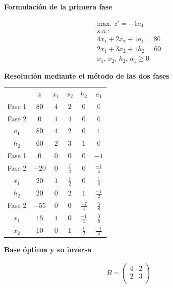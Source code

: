 \textbf{Formulación de la primera fase}

\begin{equation}
\begin{split}
\mbox{max. } z' = -1a_1\\
s.a.:\\
4x_1+2x_2+1a_1 = 80\\
2x_1+3x_2+1h_2 = 60\\
x_1,\,x_2,\,h_2,\,a_1\geq 0\end{split}
\end{equation}

\textbf{Resolución mediante el método de las dos fases}

\begin{center}
\begin{tabular}{c|c|cccc|}
 & $z$ & $x_1$ & $x_2$ & $h_2$ & $a_1$\\ 
Fase 1 & $80$ & $4$ & $2$ & $0$ & $0$ \\ 
Fase 2 & $0$ & $1$ & $4$ & $0$ & $0$ \\ 
\hline
$a_1$ & $80$  & $4$ & $2$ & $0$ & $1$\\ 
$h_2$ & $60$  & $2$ & $3$ & $1$ & $0$\\ 
\hline
Fase 1 & $0$ & $0$ & $0$ & $0$ & $-1$ \\ 
Fase 2 & $-20$ & $0$ & $\frac{7}{2}$ & $0$ & $\frac{-1}{4}$ \\ 
\hline
$x_1$ & $20$  & $1$ & $\frac{1}{2}$ & $0$ & $\frac{1}{4}$\\ 
$h_2$ & $20$  & $0$ & $2$ & $1$ & $\frac{-1}{2}$\\ 
\hline
Fase 2 & $-55$ & $0$ & $0$ & $\frac{-7}{4}$ & $\frac{5}{8}$ \\ 
\hline
$x_1$ & $15$  & $1$ & $0$ & $\frac{-1}{4}$ & $\frac{3}{8}$\\ 
$x_2$ & $10$  & $0$ & $1$ & $\frac{1}{2}$ & $\frac{-1}{4}$\\ 
\hline
\end{tabular}
\end{center}


\textbf{Base óptima y su inversa}

\begin{equation}
\begin{split}
B =\begin{pmatrix}
4 & 2\\
2 & 3\\
\end{pmatrix}
\end{split}
\end{equation}

